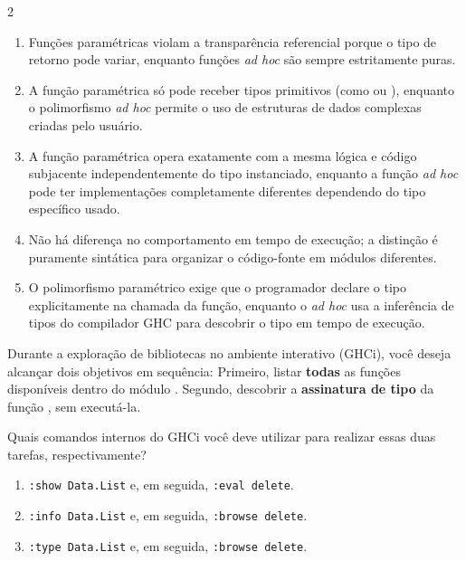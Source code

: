 \documentclass[a4paper,10pt,brazil]{article}
\begin{document}
\begin{multicols}{2}
\begin{enumerate}
  \item Funções paramétricas violam a transparência referencial porque o tipo de retorno pode variar, enquanto funções \emph{ad hoc} são sempre estritamente puras.

  \item A função paramétrica só pode receber tipos primitivos (como  ou ), enquanto o polimorfismo \emph{ad hoc} permite o uso de estruturas de dados complexas criadas pelo usuário.

  \item A função paramétrica opera exatamente com a mesma lógica e código subjacente independentemente do tipo instanciado, enquanto a função \emph{ad hoc} pode ter implementações completamente diferentes dependendo do tipo específico usado.

  \item Não há diferença no comportamento em tempo de execução; a distinção é puramente sintática para organizar o código-fonte em módulos diferentes.

  \item O polimorfismo paramétrico exige que o programador declare o tipo explicitamente na chamada da função, enquanto o \emph{ad hoc} usa a inferência de tipos do compilador GHC para descobrir o tipo em tempo de execução.


\end{enumerate}

Durante a exploração de bibliotecas no ambiente interativo (GHCi), você deseja alcançar dois objetivos em sequência:
Primeiro, listar \textbf{todas} as funções disponíveis dentro do módulo .
Segundo, descobrir a \textbf{assinatura de tipo} da função , sem executá-la.

Quais comandos internos do GHCi você deve utilizar para realizar essas duas tarefas, respectivamente?

\begin{enumerate}
  \item \texttt{:show Data.List} e, em seguida, \texttt{:eval delete}.

  \item \texttt{:info Data.List} e, em seguida, \texttt{:browse delete}.

  \item \texttt{:type Data.List} e, em seguida, \texttt{:browse delete}.


\end{enumerate}
\end{multicols}
\end{document}
